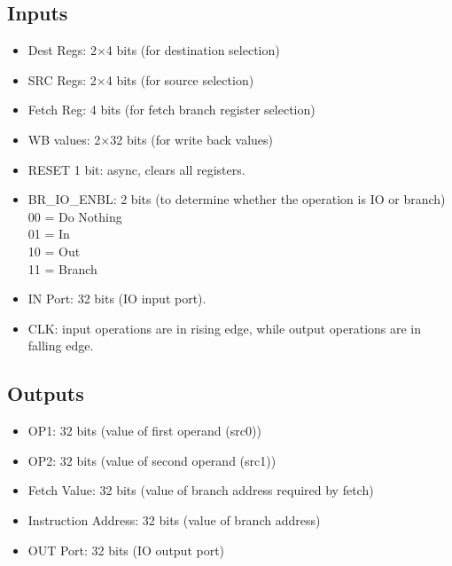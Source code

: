 \subsection{Inputs}
\begin{itemize}
    \item Dest Regs: 2$\times$4 bits (for destination selection)
    \item SRC Regs: 2$\times$4 bits (for source selection)
    \item Fetch Reg: 4 bits (for fetch branch register selection)
    \item WB values: 2$\times$32 bits (for write back values)
    \item RESET 1 bit: async, clears all registers.
    \item BR\_IO\_ENBL: 2 bits (to determine whether the operation is IO or branch)\\
    00 = Do Nothing\\
    01 = In\\
    10 = Out\\
    11 = Branch\\
    \item IN Port: 32 bits (IO input port).
    \item CLK: input operations are in rising edge, while output operations are in falling edge.
\end{itemize}

\subsection{Outputs}
\begin{itemize}
    \item OP1: 32 bits (value of first operand (src0))
    \item OP2: 32 bits (value of second operand (src1))
    \item Fetch Value: 32 bits (value of branch address required by fetch)
    \item Instruction Address: 32 bits (value of branch address)
    \item OUT Port: 32 bits (IO output port)
\end{itemize}

